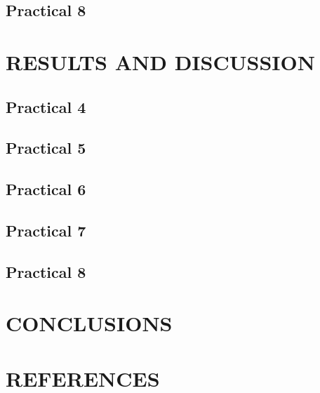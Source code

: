 \documentclass[
]{article}
\begin{document}
\hypertarget{practical-8}{%
\subsection{Practical 8}\label{practical-8}}

\hypertarget{results-and-discussion}{%
\section{RESULTS AND DISCUSSION}\label{results-and-discussion}}

\hypertarget{practical-4}{%
\subsection{Practical 4}\label{practical-4}}

\hypertarget{practical-5-1}{%
\subsection{Practical 5}\label{practical-5-1}}

\hypertarget{practical-6-1}{%
\subsection{Practical 6}\label{practical-6-1}}

\hypertarget{practical-7-1}{%
\subsection{Practical 7}\label{practical-7-1}}

\hypertarget{practical-8-1}{%
\subsection{Practical 8}\label{practical-8-1}}

\hypertarget{conclusions}{%
\section{CONCLUSIONS}\label{conclusions}}

\hypertarget{references}{%
\section{REFERENCES}\label{references}}
\end{document}
